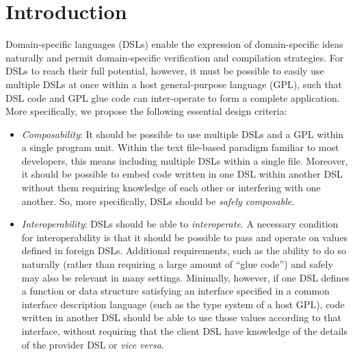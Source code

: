 \section{Introduction}
\label{s:intro}

Domain-specific languages (DSLs) \cite{shellchapter, coldfusion,
  sinatra}
enable the expression of  
domain-specific ideas naturally and permit domain-specific
verification and compilation strategies.  For DSLs to reach their full
potential, however, it must be possible to easily use multiple
DSLs at once within a host general-purpose language (GPL), such that DSL code
and GPL glue code can inter-operate to form a complete application. More specifically, we propose the following essential design criteria:

\begin{itemize}

\item \emph {Composability}: It should be possible to use multiple DSLs and a GPL
within a single program unit.  %
Within the text file-based paradigm familiar to most developers, this 
means including multiple DSLs within a single file.
 Moreover, it should be possible to embed code written in one DSL
  within another DSL without them requiring knowledge of each other or interfering with one another. So, more specifically, DSLs should be \emph{safely composable}.

\item \emph{Interoperability}: DSLs should be able to \emph{interoperate}. A necessary condition for interoperability is that it should be
  possible to pass and operate on values 
  defined in foreign DSLs. Additional requirements, such as the ability to do so naturally (rather than requiring a large amount of ``glue code'') and safely may also be relevant in many settings. 
  Minimally, however, if one DSL defines a function or data structure satisfying an interface specified in
  a common interface description language (such as the type system of
  a host GPL), code written in another DSL should be able to use those
  values according to that interface, without requiring that the client DSL
  have knowledge of the details of the provider DSL or \emph{vice versa}.

\end{itemize}




